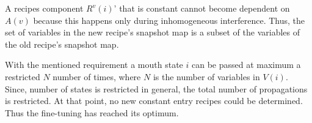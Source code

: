 \documentclass[12pt,a4paper]{scrartcl}
\begin{document}
A recipes component $R^v(i)$' that is constant cannot become dependent on
$A(v)$ because this happens only during inhomogeneous interference. Thus, the
set of variables in the new recipe's snapshot map is a subset of the variables
of the old recipe's snapshot map.

With the mentioned requirement a mouth state $i$ can be passed at maximum a
restricted $N$ number of times, where $N$ is the number of variables in
$V(i)$. Since, number of states is restricted in general, the total number of
propagations is restricted. At that point, no new constant entry recipes could
be determined. Thus the fine-tuning has reached its optimum.
\end{document}
